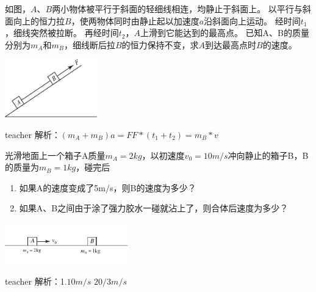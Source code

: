 \begin{example}
如图，$A$、$B$两小物体被平行于斜面的轻细线相连，均静止于斜面上。
以平行与斜面向上的恒力拉$B$，使两物体同时由静止起以加速度$a$沿斜面向上运动。
经时间$t_1$，细线突然被拉断。
再经时间$t_2$，$A$上滑到它能达到的最高点。
已知A、B的质量分别为$m_A$和$m_B$，细线断后拉$B$的恒力保持不变，求$A$到达最高点时$B$的速度。
	\begin{flushright}
		\includegraphics[width = 0.3\textwidth]{images/momentum-2.pdf} 
	\end{flushright}
\begin{taggedblock}{teacher}
\noindent
解析：$(m_A+m_B)a=F  F*(t_1+t_2)=m_B*v$
\end{taggedblock}
\end{example}

\begin{example}
光滑地面上一个箱子A质量$m_A = 2\unit{kg}$，以初速度$v_0 = 10\unit{m/s}$冲向静止的箱子B，B的质量为$m_B=1\unit{kg}$，碰完后
\begin{enumerate}
\item 如果A的速度变成了5\unit{m/s}，则B的速度为多少？
\item 如果A、B之间由于涂了强力胶水一碰就沾上了，则合体后速度为多少？
\end{enumerate}
\begin{flushright}
\includegraphics[width=0.4\textwidth]{images/momentum-problem-1.pdf}
\end{flushright}
\begin{taggedblock}{teacher}
\noindent
解析：1.$10m/s$ $20/3 m/s$
\end{taggedblock}
\end{example}


